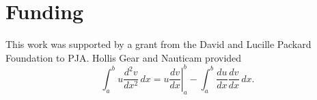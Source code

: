 \section{Funding}
\label{funding} 
This work was supported by a grant from the David and Lucille Packard Foundation to PJA. Hollis Gear and Nauticam provided 
\begin{equation}
\label{eqn:drag}
	\int_a^bu\frac{d^2v}{dx^2}\,dx
	=\left.u\frac{dv}{dx}\right|_a^b
	-\int_a^b\frac{du}{dx}\frac{dv}{dx}\,dx.
\end{equation}
